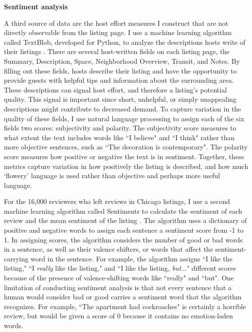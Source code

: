 \textbf{Sentiment analysis}

A third source of data are the host effort measures I construct that are not directly observable from the listing page. I use a machine learning algorithm called TextBlob, developed for Python, to analyze the descriptions hosts write of their listings \citep{textblob}. There are several host-written fields on each listing page, the Summary, Description, Space, Neighborhood Overview, Transit, and Notes. By filling out these fields, hosts describe their listing and have the opportunity to provide guests with helpful tips and information about the surrounding area. These descriptions can signal host effort, and therefore a listing's potential quality. This signal is important since short, unhelpful, or simply unappealing descriptions might contribute to decreased demand. To capture variation in the quality of these fields, I use natural language processing to assign each of the six fields two scores: subjectivity and polarity. The subjectivity score measures to what extent the text includes words like ``I believe" and ``I think" rather than more objective sentences, such as ``The decoration is contemporary". The polarity score measures how positive or negative the text is in sentiment. Together, these metrics capture variation in how positively the listing is described, and how much `flowery' language is used rather than objective and perhaps more useful language.

For the 16,000 reviewers who left reviews in Chicago listings, I use a second machine learning algorithm called Sentimentr to calculate the sentiment of each review and the mean sentiment of the listing \citep{sentimentr}. The algorithm uses a dictionary of positive and negative words to assign each sentence a sentiment score from -1 to 1. In assigning scores, the algorithm considers the number of good or bad words in a sentence, as well as their valence shifters, or words that affect the sentiment-carrying word in the sentence. For example, the algorithm assigns ``I like the listing," ``I \textit{really} like the listing," and ``I like the listing, \textit{but}..." different scores because of the presence of valence-shifting words like ``really" and ``but". One limitation of conducting sentiment analysis is that not every sentence that a human would consider bad or good carries a sentiment word that the algorithm recognizes. For example, ``The apartment had cockroaches" is certainly a horrible review, but would be given a score of 0 because it contains no emotion-laden words. 


